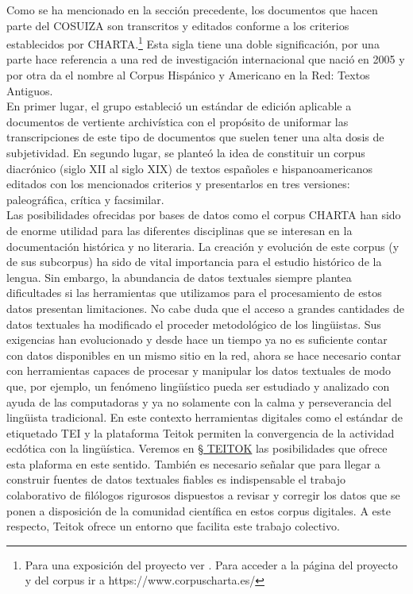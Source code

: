 \documentclass[
]{book}
\begin{document}
Como se ha mencionado en la sección precedente, los documentos que hacen parte del COSUIZA son transcritos y editados conforme a los criterios establecidos por CHARTA.\footnote{Para una exposición del proyecto ver \citet{areta2014sin}. Para acceder a la página del proyecto y del corpus ir a https://www.corpuscharta.es/} Esta sigla tiene una doble significación, por una parte hace referencia a una red de investigación internacional que nació en 2005 y por otra da el nombre al {C}orpus {H}ispánico y {A}mericano en la {R}ed: {T}extos {A}ntiguos.\\
En primer lugar, el grupo estableció un estándar de edición aplicable a documentos de vertiente archivística con el propósito de uniformar las transcripciones de este tipo de documentos que suelen tener una alta dosis de subjetividad. En segundo lugar, se planteó la idea de constituir un corpus diacrónico (siglo XII al siglo XIX) de textos españoles e hispanoamericanos editados con los mencionados criterios y presentarlos en tres versiones: paleográfica, crítica y facsimilar.\\
Las posibilidades ofrecidas por bases de datos como el corpus CHARTA han sido de enorme utilidad para las diferentes disciplinas que se interesan en la documentación histórica y no literaria. La creación y evolución de este corpus (y de sus subcorpus) ha sido de vital importancia para el estudio histórico de la lengua.
Sin embargo, la abundancia de datos textuales siempre plantea dificultades si las herramientas que utilizamos para el procesamiento de estos datos presentan limitaciones. No cabe duda que el acceso a grandes cantidades de datos textuales ha modificado el proceder metodológico de los lingüistas. Sus exigencias han evolucionado y desde hace un tiempo ya no es suficiente contar con datos disponibles en un mismo sitio en la red, ahora se hace necesario contar con herramientas capaces de procesar y manipular los datos textuales de modo que, por ejemplo, un fenómeno lingüístico pueda ser estudiado y analizado con ayuda de las computadoras y ya no solamente con la calma y perseverancia del lingüista tradicional. En este contexto herramientas digitales como el estándar de etiquetado TEI y la plataforma Teitok permiten la convergencia de la actividad ecdótica con la lingüística. Veremos en \protect\hyperlink{teitok}{§ TEITOK} las posibilidades que ofrece esta plaforma en este sentido.
También es necesario señalar que para llegar a construir fuentes de datos textuales fiables es indispensable el trabajo colaborativo de filólogos rigurosos dispuestos a revisar y corregir los datos que se ponen a disposición de la comunidad científica en estos corpus digitales. A este respecto, Teitok ofrece un entorno que facilita este trabajo colectivo.
\end{document}
